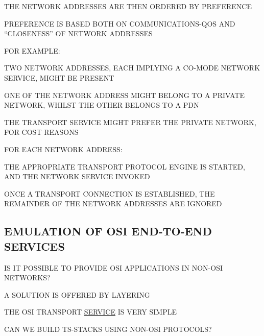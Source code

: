 \begin{bwslide}

\begin{nrtc}
\item	THE NETWORK ADDRESSES ARE THEN ORDERED BY PREFERENCE

\item	PREFERENCE IS BASED BOTH ON COMMUNICATIONS-QOS AND ``CLOSENESS''
	OF NETWORK ADDRESSES

\item	FOR EXAMPLE:
    \begin{nrtc}
    \item	TWO NETWORK ADDRESSES, EACH IMPLYING A CO-MODE NETWORK
		SERVICE, MIGHT BE PRESENT

    \item	ONE OF THE NETWORK ADDRESS MIGHT BELONG TO A PRIVATE
		NETWORK, WHILST THE OTHER BELONGS TO A PDN

    \item	THE TRANSPORT SERVICE MIGHT PREFER THE PRIVATE NETWORK,
		FOR COST REASONS
    \end{nrtc}
\end{nrtc}
\end{bwslide}


\begin{bwslide}

\begin{nrtc}
\item	FOR EACH NETWORK ADDRESS:
    \begin{nrtc}
    \item	THE APPROPRIATE TRANSPORT PROTOCOL ENGINE IS STARTED,
		AND THE NETWORK SERVICE INVOKED

    \item	ONCE A TRANSPORT CONNECTION IS ESTABLISHED,
		THE REMAINDER OF THE NETWORK ADDRESSES ARE IGNORED
    \end{nrtc}
\end{nrtc}
\end{bwslide}


\begin{bwslide}
\part*	{EMULATION OF OSI END-TO-END SERVICES}\bf

\begin{nrtc}
\item	IS IT POSSIBLE TO PROVIDE OSI APPLICATIONS IN NON-OSI NETWORKS?

\item	A SOLUTION IS OFFERED BY LAYERING
    \begin{nrtc}
    \item	THE OSI TRANSPORT \underline{SERVICE} IS VERY SIMPLE
    \end{nrtc}

\item	CAN WE BUILD TS-STACKS USING NON-OSI PROTOCOLS?
\end{nrtc}
\end{bwslide}


